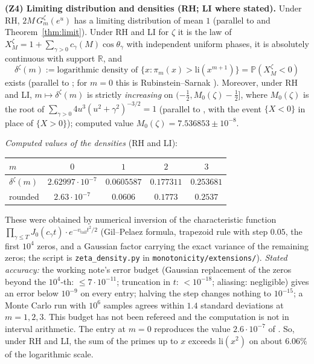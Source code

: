 \documentclass[11pt]{amsart}
\theoremstyle{definition}
\numberwithin{equation}{section}
\newcommand{\PP}{\mathbb P}
\begin{document}
\noindent\textbf{(Z4) Limiting distribution and densities (RH; LI
where stated).} Under RH, $2M\,G^\zeta_m(e^u)$ has a
limiting distribution of mean $1$ (parallel to
\cite[Theorem~1(i)]{WR} and Theorem~\ref{thm:limit}). Under RH and LI
for $\zeta$ it is the law of
$X^\zeta_M=1+\sum_{\gamma>0}c_\gamma(M)\cos\theta_\gamma$ with
independent uniform phases, it is absolutely continuous with support
$\mathbb R$, and
\[
\delta^\zeta(m):=\text{logarithmic density of }
\{x:\pi_m(x)>\mathrm{li}(x^{m+1})\}=\PP(X^\zeta_M<0)
\]
exists (parallel to \cite[Theorem~1(ii)]{WR}; for $m=0$ this is
Rubinstein--Sarnak \cite{RS94}). Moreover, under RH and LI,
$m\mapsto\delta^\zeta(m)$ is strictly \emph{increasing} on
$(-\tfrac12,M_0(\zeta)-\tfrac12]$, where $M_0(\zeta)$ is the root of
$\sum_{\gamma>0}4u^3(u^2+\gamma^2)^{-3/2}=1$ (parallel to
\cite[the coupling monotonicity theorem]{MC}, with the event $\{X<0\}$ in place of
$\{X>0\}$); computed value $M_0(\zeta)=7.536853\pm10^{-8}$.

\smallskip\noindent\emph{Computed values of the densities} (RH and
LI):
\begin{center}
\begin{tabular}{lcccc}
\toprule
$m$ & $0$ & $1$ & $2$ & $3$\\
\midrule
$\delta^\zeta(m)$ & $2.62997\cdot10^{-7}$ & $0.0605587$ &
$0.177311$ & $0.253681$\\
rounded & $2.63\cdot10^{-7}$ & $0.0606$ & $0.1773$ & $0.2537$\\
\bottomrule
\end{tabular}
\end{center}
These were obtained by numerical inversion of the characteristic
function $\prod_{\gamma\le T}J_0(c_\gamma t)\cdot
e^{-v_{\mathrm{tail}}t^2/2}$ (Gil--Pelaez formula, trapezoid rule with
step $0.05$, the first $10^4$ zeros, and a Gaussian factor carrying
the exact variance of the remaining zeros; the script is
\texttt{zeta\_density.py} in \texttt{monotonicity/extensions/}).
\emph{Stated accuracy:} the
working note's error budget (Gaussian replacement of the zeros beyond
the $10^4$-th: $\le7\cdot10^{-11}$; truncation in $t$: $<10^{-18}$;
aliasing: negligible) gives an error below $10^{-9}$ on every entry;
halving the step changes nothing to $10^{-15}$; a Monte Carlo run
with $10^6$ samples agrees within $1.4$ standard deviations at
$m=1,2,3$. This budget has not been refereed and the computation is
not in interval arithmetic. The entry at $m=0$ reproduces the value
$2.6\cdot10^{-7}$ of \cite{RS94}. So, under RH and LI, the sum of the
primes up to $x$ exceeds $\mathrm{li}(x^2)$ on about $6.06\%$ of the
logarithmic scale.
\end{document}
